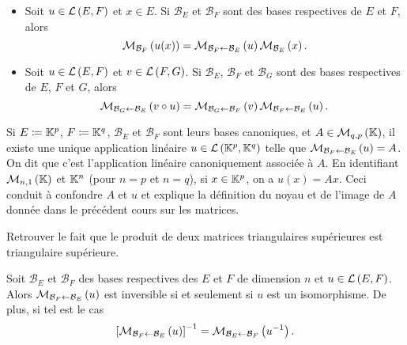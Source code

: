 \documentclass{magnolia}
\begin{document}
\begin{proposition}[utile=-3]
$\quad$
\begin{itemize}
\item Soit $u\in\mathcal{L}\left(E,F\right)$ et $x\in E$. Si $\mathcal{B}_E$ et $\mathcal{B}_F$ sont
  des bases respectives de $E$ et $F$, alors
  \[\mathcal{M}_{\mathcal{B}_F}\left(u(x)\right)=\mathcal{M}_{\mathcal{B}_F\gets\mathcal{B}_E}\left(u\right)
    \mathcal{M}_{\mathcal{B}_E}\left(x\right).\]
\item Soit $u\in\mathcal{L}\left(E,F\right)$ et $v\in\mathcal{L}\left(F,G\right)$. Si $\mathcal{B}_E$,
  $\mathcal{B}_F$ et $\mathcal{B}_G$ sont des bases respectives de $E$, $F$ et $G$,
  alors
  \[\mathcal{M}_{\mathcal{B}_G\gets\mathcal{B}_E}\left(v\circ u\right)=
    \mathcal{M}_{\mathcal{B}_G\gets\mathcal{B}_F}\left(v\right)
    \mathcal{M}_{\mathcal{B}_F\gets\mathcal{B}_E}\left(u\right).\]
\end{itemize}
\end{proposition}

\begin{remarqueUnique}
\remarque Si $E\coloneqq\mathbb{K}^p$,
  $F\coloneqq\mathbb{K}^q$, $\mathcal{B}_E$ et $\mathcal{B}_F$ sont leurs bases canoniques,
  et $A\in\mathcal{M}_{q,p}\left(\mathbb{K}\right)$,
  il existe une unique application linéaire $u\in\mathcal{L}\left(\mathbb{K}^p,\mathbb{K}^q\right)$
  telle que $\mathcal{M}_{\mathcal{B}_F\gets\mathcal{B}_E}\left(u\right)=A$. On dit que c'est
  l'application linéaire canoniquement associée à $A$. En identifiant
  $\mathcal{M}_{n,1}\left(\mathbb{K}\right)$ et $\mathbb{K}^n$ (pour $n=p$ et $n=q$), si $x\in\mathbb{K}^p$, on a
  $u(x)=Ax$. Ceci conduit à confondre $A$ et $u$ et explique la définition
  du noyau et de l'image de $A$ donnée dans le précédent cours sur les matrices.
\end{remarqueUnique}

\begin{exoUnique}
\exo Retrouver le fait que le produit de deux matrices triangulaires
  supérieures est triangulaire supérieure.  
\end{exoUnique}

\begin{proposition}[utile=-3]
Soit $\mathcal{B}_E$ et $\mathcal{B}_F$ des bases respectives des \Kevs $E$ et $F$
de dimension $n$ et $u\in\mathcal{L}\left(E,F\right)$. Alors $\mathcal{M}_{\mathcal{B}_F\gets\mathcal{B}_E}\left(u\right)$ est
inversible si et seulement si $u$ est un isomorphisme. De plus, si
tel est le cas
\[\left[\mathcal{M}_{\mathcal{B}_F\gets\mathcal{B}_E}\left(u\right)\right]^{-1}=\mathcal{M}_{\mathcal{B}_E\gets\mathcal{B}_F}\left(u^{-1}\right).\]
\end{proposition}
\end{document}
